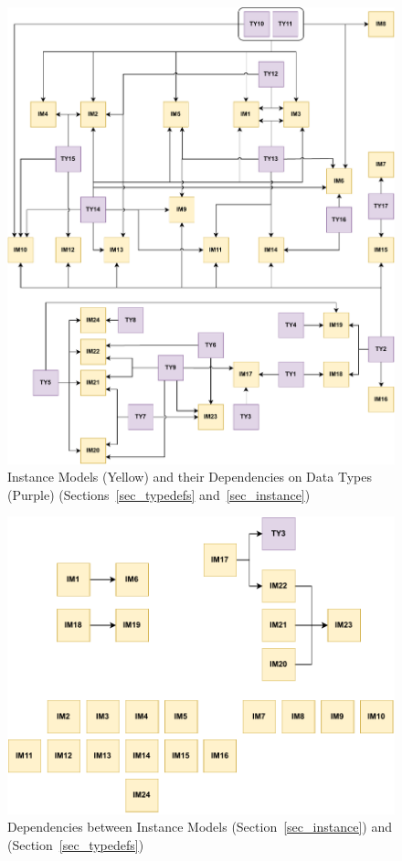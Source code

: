 \vspace*{\fill}
\begin{figure}[tbh]
    \centering
    \includegraphics[width=0.82\linewidth]{figures/types2instance.pdf}
    \caption[Instance Models and their Dependencies on Data Types]{Instance
    Models (Yellow) and their Dependencies on Data Types (Purple)
        (Sections~\ref{sec_typedefs} and~\ref{sec_instance})}
    \label{fig:TY2IM}
\end{figure}
\vspace*{\fill}

\vspace*{\fill}
\begin{figure}[tbh]
    \centering
    \includegraphics[width=0.9\linewidth]{figures/instance2instance.pdf}
    \caption[Dependencies between Instance Models and
    ]{Dependencies between Instance Models
    (Section~\ref{sec_instance}) and 
    (Section~\ref{sec_typedefs})}
    \label{fig:IM}
\end{figure}
\vspace*{\fill}


